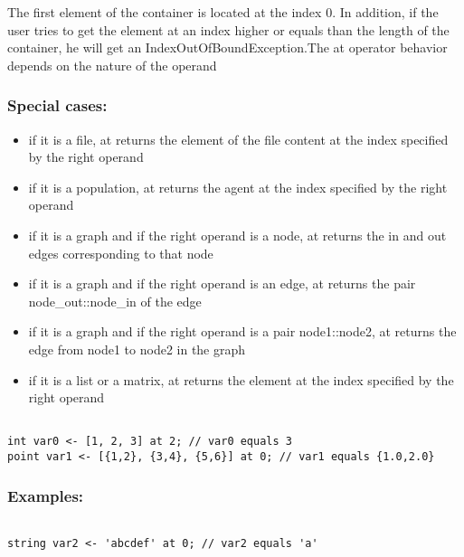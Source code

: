\documentclass[]{book}
\providecommand{\tightlist}{%
  \setlength{\itemsep}{0pt}\setlength{\parskip}{0pt}}
\theoremstyle{definition}
\theoremstyle{definition}
\theoremstyle{definition}
\theoremstyle{remark}
\begin{document}
The first element of the container is located at the index 0. In
addition, if the user tries to get the element at an index higher or
equals than the length of the container, he will get an
IndexOutOfBoundException.The at operator behavior depends on the nature
of the operand

\subsubsection{Special cases:}\label{special-cases-23}

\begin{itemize}
\tightlist
\item
  if it is a file, at returns the element of the file content at the
  index specified by the right operand\\
\item
  if it is a population, at returns the agent at the index specified by
  the right operand\\
\item
  if it is a graph and if the right operand is a node, at returns the in
  and out edges corresponding to that node\\
\item
  if it is a graph and if the right operand is an edge, at returns the
  pair node\_out::node\_in of the edge\\
\item
  if it is a graph and if the right operand is a pair node1::node2, at
  returns the edge from node1 to node2 in the graph\\
\item
  if it is a list or a matrix, at returns the element at the index
  specified by the right operand
\end{itemize}

\begin{verbatim}
 
int var0 <- [1, 2, 3] at 2; // var0 equals 3 
point var1 <- [{1,2}, {3,4}, {5,6}] at 0; // var1 equals {1.0,2.0}
\end{verbatim}

\subsubsection{Examples:}\label{examples-46}

\begin{verbatim}
 
string var2 <- 'abcdef' at 0; // var2 equals 'a'
\end{verbatim}
\end{document}
